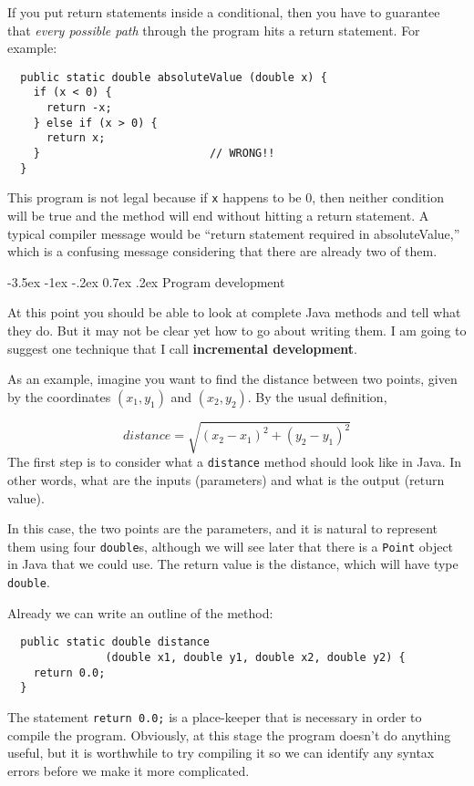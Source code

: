 \documentclass{book}
\makeatletter
\renewcommand{\section}{\@startsection 
    {section} {1} {0mm}%
    {-3.5ex \@plus -1ex \@minus -.2ex}%
    {0.7ex \@plus.2ex}%
    {\normalfont\Large\bfseries}}
\makeatother
\begin{document}

If you put return statements inside a conditional, then
you have to guarantee that {\em every possible path} through
the program hits a return statement.  For example:

\begin{verbatim}
  public static double absoluteValue (double x) {
    if (x < 0) {
      return -x;
    } else if (x > 0) {
      return x;
    }                          // WRONG!!
  }
\end{verbatim}
%
This program is not legal because if {\tt x} happens to be 0, then
neither condition will be true and the method will end without hitting
a return statement.  A typical compiler message would be ``return
statement required in absoluteValue,'' which is a confusing message
considering that there are already two of them.

\section{Program development}
\label{distance}

At this point you should be able to look at complete Java methods
and tell what they do.  But it may not be clear yet how to go
about writing them.  I am going to suggest one technique that
I call {\bf incremental development}.


As an example, imagine you want to find the distance between
two points, given by the coordinates $(x_1, y_1)$ and
$(x_2, y_2)$.  By the usual definition,

\begin{equation}
distance = \sqrt{(x_2 - x_1)^2 + (y_2 - y_1)^2}
\end{equation}
%
The first step is to consider what a {\tt distance} method
should look like in Java.  In other words, what are the inputs
(parameters) and what is the output (return value).

In this case, the two points are the parameters, and it is
natural to represent them using four {\tt double}s, although
we will see later that there is a {\tt Point} object in Java
that we could use.  The return value is the distance, which
will have type {\tt double}.

Already we can write an outline of the method:

\begin{verbatim}
  public static double distance
               (double x1, double y1, double x2, double y2) {
    return 0.0;
  }
\end{verbatim}
%
The statement {\tt return 0.0;} is a place-keeper that is necessary
in order to compile the program.  Obviously, at this stage the
program doesn't do anything useful, but it is worthwhile to
try compiling it so we can identify any syntax errors before
we make it more complicated.
\end{document}
